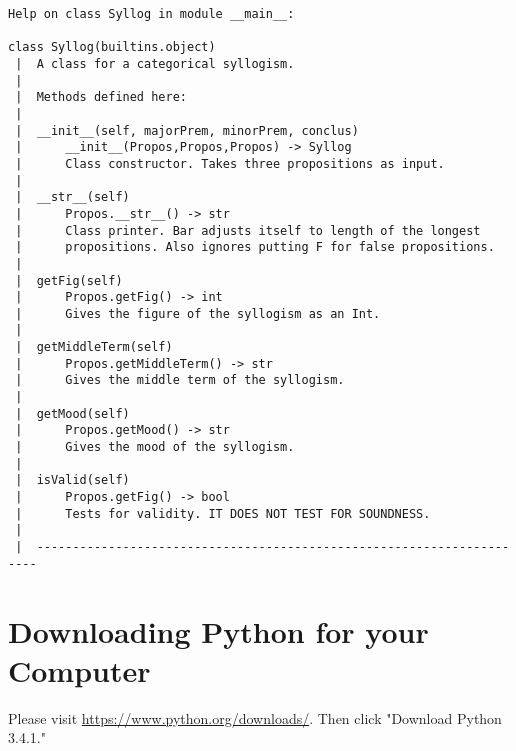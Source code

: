 \documentclass[8pt]{extarticle} %
\begin{document}
\begin{verbatim}
Help on class Syllog in module __main__:

class Syllog(builtins.object)
 |  A class for a categorical syllogism.
 |  
 |  Methods defined here:
 |  
 |  __init__(self, majorPrem, minorPrem, conclus)
 |      __init__(Propos,Propos,Propos) -> Syllog
 |      Class constructor. Takes three propositions as input.
 |  
 |  __str__(self)
 |      Propos.__str__() -> str
 |      Class printer. Bar adjusts itself to length of the longest
 |      propositions. Also ignores putting F for false propositions.
 |  
 |  getFig(self)
 |      Propos.getFig() -> int
 |      Gives the figure of the syllogism as an Int.
 |  
 |  getMiddleTerm(self)
 |      Propos.getMiddleTerm() -> str
 |      Gives the middle term of the syllogism.
 |  
 |  getMood(self)
 |      Propos.getMood() -> str
 |      Gives the mood of the syllogism.
 |  
 |  isValid(self)
 |      Propos.getFig() -> bool
 |      Tests for validity. IT DOES NOT TEST FOR SOUNDNESS.
 |  
 |  ----------------------------------------------------------------------
\end{verbatim}


\section{Downloading Python for your Computer}

Please visit \url{https://www.python.org/downloads/}. Then click "Download Python 3.4.1."
\end{document}
